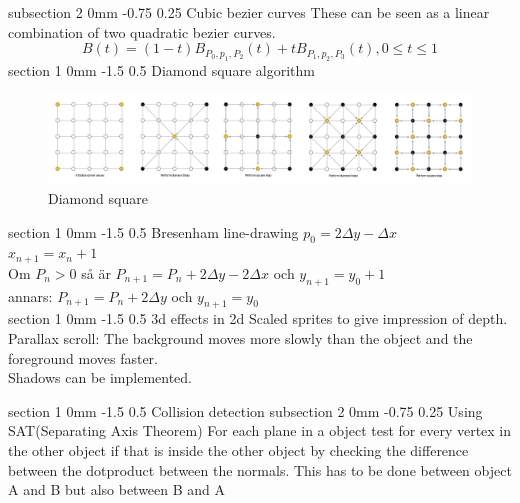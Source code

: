 \documentclass[a4paper,11pt]{article}
\makeatletter
\renewcommand{\section}{\@startsection
   {section}%
   {1}%
   {0mm}%
   {-1.5\baselineskip}%
   {0.5\baselineskip}%
   {\sffamily\bfseries\upshape\normalsize}}%
\renewcommand{\subsection}{\@startsection
   {subsection}%
   {2}%
   {0mm}%
   {-0.75\baselineskip}%
   {0.25\baselineskip}%
   {\rmfamily\normalfont\slshape\normalsize}}%
\makeatother
\begin{document}
\subsection{Cubic bezier curves}
These can be seen as a linear combination of two quadratic bezier curves.
$$B(t)=(1-t)B_{P_0,p_1,P_2}(t)+tB_{P_1,p_2,P_3}(t), 0\leq t \leq 1$$
\section{Diamond square algorithm}
\begin{center}
\begin{figure}[H]
    \centering
\includegraphics[scale=0.20]{diamond.png}
\caption{Diamond square}
\end{figure}
\end{center} 
\section{Bresenham line-drawing}
$p_0=2\Delta y-\Delta x$\\
$x_{n+1}=x_{n}+1$ \\
Om $P_n>0$ så är $P_{n+1}=P_n+2\Delta y-2\Delta x$ och $y_{n+1}=y_{0}+1$ \\
annars: $P_{n+1}=P_n+2\Delta y$ och $y_{n+1}=y_{0}$ \\

\section{3d effects in 2d}
Scaled sprites to give impression of depth. \\
Parallax scroll: The background moves more slowly than the object and the foreground moves faster.\\
Shadows can be implemented.

\section{Collision detection}
\subsection{Using SAT(Separating Axis
Theorem)}
For each plane in a object test for every vertex in the other object if that is inside
the other object by checking the difference between the dotproduct between the normals. This has to be done between object A and B but also between B and A
\end{document}
